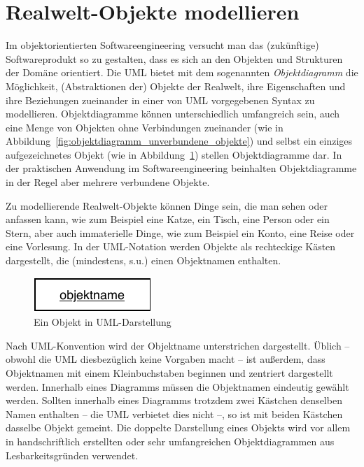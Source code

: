 \section{Realwelt-Objekte modellieren}
\label{sec:Kap-4.1}

Im objektorientierten Softwareengineering versucht man das (zukünftige) Softwareprodukt so zu gestalten, dass es sich an den Objekten und Strukturen der Domäne orientiert. Die UML bietet mit dem sogenannten \textit{Objektdiagramm}
die Möglichkeit, (Abstraktionen der) Objekte der Realwelt, ihre Eigenschaften und ihre Beziehungen zueinander in einer von UML vorgegebenen Syntax zu modellieren. Objektdiagramme können unterschiedlich umfangreich sein, auch eine Menge von Objekten ohne Verbindungen zueinander (wie in Abbildung~\ref{fig:objektdiagramm_unverbundene_objekte}) und selbst ein einziges aufgezeichnetes Objekt (wie in Abbildung~\ref{fig:objekt_in_uml-darstellung}) stellen Objektdiagramme dar. In der praktischen Anwendung im Softwareengineering beinhalten Objektdiagramme in der Regel aber mehrere verbundene Objekte. 

Zu modellierende Realwelt-Objekte 
können Dinge sein, die man sehen oder anfassen kann, wie zum Beispiel eine Katze, ein Tisch, eine Person oder ein Stern, aber auch immaterielle Dinge, wie zum Beispiel ein Konto, eine Reise oder eine Vorlesung. In der UML-Notation werden Objekte als rechteckige Kästen dargestellt, die (mindestens, s.u.) einen Objektnamen enthalten.

\vspace{2mm} %

\begin{figure}[h!]
	\centering
	\includegraphics{Bilder/Kapitel-4/objekt_in_uml-darstellung.pdf}
	\caption{Ein Objekt in UML-Darstellung}
	\label{fig:objekt_in_uml-darstellung}
\end{figure}

Nach UML-Konvention wird der Objektname unterstrichen dargestellt. Üblich – obwohl die UML diesbezüglich keine Vorgaben macht – ist außerdem, dass Objektnamen mit einem Kleinbuchstaben beginnen und zentriert dargestellt werden. Innerhalb eines Diagramms müssen die Objektnamen eindeutig gewählt werden. Sollten innerhalb eines Diagramms trotzdem zwei Kästchen denselben Namen enthalten – die UML verbietet dies nicht –, so ist mit beiden Kästchen dasselbe Objekt gemeint. Die doppelte Darstellung eines Objekts wird vor allem in handschriftlich erstellten oder sehr umfangreichen Objektdiagrammen aus Lesbarkeitsgründen verwendet.

